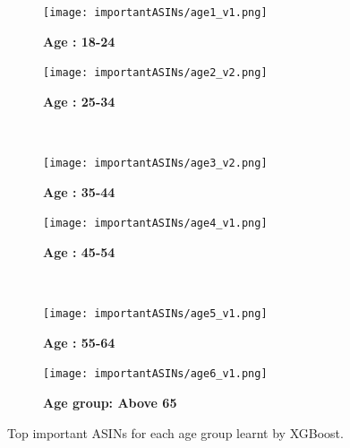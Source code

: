 \begin{figure}[ht]
  \captionsetup{font=small}
  \centering
  \begin{subfigure}[b]{0.5\linewidth}
    \caption{\textbf{Age : 18-24}}
    \centering\texttt{[image: importantASINs/age1\_v1.png]}
  \end{subfigure}%
  \begin{subfigure}[b]{0.5\linewidth}
    \caption{\textbf{Age : 25-34}}
    \centering\texttt{[image: importantASINs/age2\_v2.png]}
  \end{subfigure}
\\
    \begin{subfigure}[b]{0.5\linewidth}
    \caption{\textbf{Age : 35-44}}
    \centering\texttt{[image: importantASINs/age3\_v2.png]}
  \end{subfigure}%
  \begin{subfigure}[b]{0.5\linewidth}
    \caption{\textbf{Age : 45-54}}
    \centering\texttt{[image: importantASINs/age4\_v1.png]}
  \end{subfigure}
\\
  \begin{subfigure}[b]{0.5\linewidth}
    \caption{\textbf{Age : 55-64}}
    \centering\texttt{[image: importantASINs/age5\_v1.png]}
  \end{subfigure}%
  \begin{subfigure}[b]{0.5\linewidth}
    \caption{\textbf{Age group: Above 65}}
    \centering\texttt{[image: importantASINs/age6\_v1.png]}
  \end{subfigure}
  \caption{Top important ASINs for each age group learnt by XGBoost.}
  \label{fig:important_asins}
\end{figure}
%
